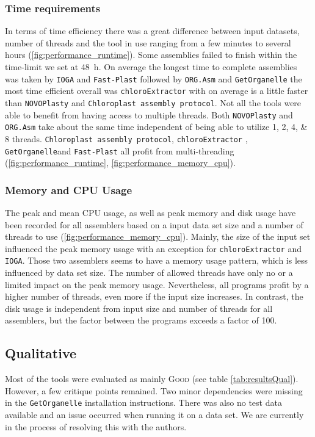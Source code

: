 \documentclass{bmcart}
\newcommand{\formatprogramnames}[1]{\texttt{#1}}
\newcommand{\ce}{\formatprogramnames{chloroExtractor}}
\newcommand{\oa}{\formatprogramnames{ORG.Asm}}
\newcommand{\fp}{\formatprogramnames{Fast-Plast}}
\newcommand{\ioga}{\formatprogramnames{IOGA}}
\newcommand{\np}{\formatprogramnames{NOVOPlasty}}
\newcommand{\go}{\formatprogramnames{GetOrganelle}}
\newcommand{\cassp}{\formatprogramnames{Chloroplast assembly protocol}}
\newcommand{\good}{\textsc{Good}}
\begin{document}
\subsubsection*{Time requirements}
In terms of time efficiency there was a great difference between input datasets, number of threads and the tool in use ranging from a few minutes to several hours (\cref{fig:performance_runtime}).
Some assemblies failed to finish within the time-limit we set at \SI{48}{\hour}. 
On average the longest time to complete assemblies was taken by \ioga{} and \fp{} followed by \oa{} and \go{} the most time efficient overall was \ce{} with on average is a little faster than \np{} and \cassp{}.
Not all the tools were able to benefit from having access to multiple threads. Both \np{} and \oa{} take about the same time independent of being able to utilize \numlist[list-final-separator={, or }]{1;2;4;8} threads. \cassp{}, \ce{} , \go and \fp{} all profit from multi-threading (\cref{fig:performance_runtime}, \cref{fig:performance_memory_cpu}).

\subsubsection*{Memory and CPU Usage }
The peak and mean CPU usage, as well as peak memory and disk usage have been recorded for all assemblers based on a input data set size and a number of threads to use (\cref{fig:performance_memory_cpu}).
Mainly, the size of the input set influenced the peak memory usage with an exception for \ce{} and \ioga{}.
Those two assemblers seems to have a memory usage pattern, which is less influenced by data set size.
The number of allowed threads have only no or a limited impact on the peak memory usage.
Nevertheless, all programs profit by a higher number of threads, even more if the input size increases.
In contrast, the disk usage is independent from input size and number of threads for all assemblers, but the factor between the programs exceeds a factor of \num{100}.

\subsection*{Qualitative}
Most of the tools were evaluated as mainly \good{} (see table \ref{tab:resultsQual}). However, a few critique points remained.
Two minor dependencies were missing in the \go{} installation instructions. There was also no test data available and an issue occurred when running it on a  data set. We are currently in the process of resolving this with the authors.
\end{document}
